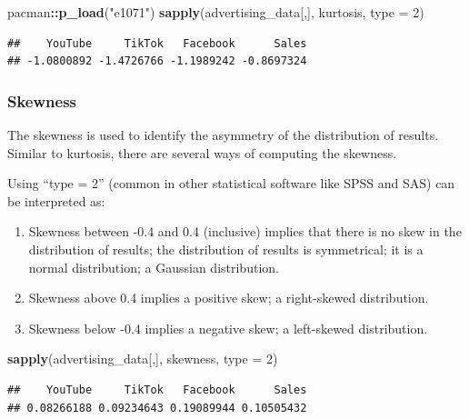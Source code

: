 \documentclass[
]{article}
\newenvironment{Shaded}{\begin{snugshade}}{\end{snugshade}}
\newcommand{\AttributeTok}[1]{\textcolor[rgb]{0.13,0.29,0.53}{#1}}
\newcommand{\DecValTok}[1]{\textcolor[rgb]{0.00,0.00,0.81}{#1}}
\newcommand{\FunctionTok}[1]{\textcolor[rgb]{0.13,0.29,0.53}{\textbf{#1}}}
\newcommand{\NormalTok}[1]{#1}
\newcommand{\SpecialCharTok}[1]{\textcolor[rgb]{0.81,0.36,0.00}{\textbf{#1}}}
\newcommand{\StringTok}[1]{\textcolor[rgb]{0.31,0.60,0.02}{#1}}
\begin{document}
\begin{Shaded}
\begin{Highlighting}[]
\NormalTok{pacman}\SpecialCharTok{::}\FunctionTok{p\_load}\NormalTok{(}\StringTok{"e1071"}\NormalTok{)}
\FunctionTok{sapply}\NormalTok{(advertising\_data[,],  kurtosis, }\AttributeTok{type =} \DecValTok{2}\NormalTok{)}
\end{Highlighting}
\end{Shaded}

\begin{verbatim}
##    YouTube     TikTok   Facebook      Sales 
## -1.0800892 -1.4726766 -1.1989242 -0.8697324
\end{verbatim}

\subsubsection{\texorpdfstring{\textbf{Skewness}}{Skewness}}\label{skewness}

The skewness is used to identify the asymmetry of the distribution of
results. Similar to kurtosis, there are several ways of computing the
skewness.

Using ``type = 2'' (common in other statistical software like SPSS and
SAS) can be interpreted as:

\begin{enumerate}
\def\labelenumi{\arabic{enumi}.}
\item
  Skewness between -0.4 and 0.4 (inclusive) implies that there is no
  skew in the distribution of results; the distribution of results is
  symmetrical; it is a normal distribution; a Gaussian distribution.
\item
  Skewness above 0.4 implies a positive skew; a right-skewed
  distribution.
\item
  Skewness below -0.4 implies a negative skew; a left-skewed
  distribution.
\end{enumerate}

\begin{Shaded}
\begin{Highlighting}[]
\FunctionTok{sapply}\NormalTok{(advertising\_data[,], skewness, }\AttributeTok{type =} \DecValTok{2}\NormalTok{)}
\end{Highlighting}
\end{Shaded}

\begin{verbatim}
##    YouTube     TikTok   Facebook      Sales 
## 0.08266188 0.09234643 0.19089944 0.10505432
\end{verbatim}
\end{document}
